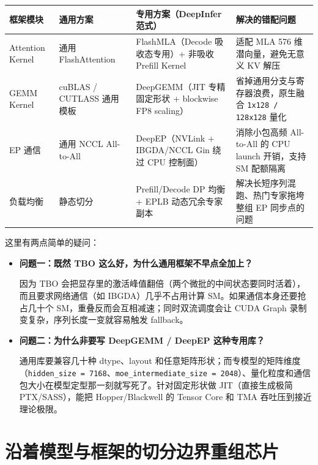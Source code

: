 \documentclass[11pt]{article}
\begin{document}
\begin{table}[htbp]
  \centering
  \small
  \begin{tabular}{p{2.0cm}p{3.0cm}p{5.0cm}p{4.8cm}}
    \hline
    \textbf{框架模块} & \textbf{通用方案} & \textbf{专用方案（DeepInfer 范式）} & \textbf{解决的错配问题} \\
    \hline
    Attention Kernel & 通用 FlashAttention & FlashMLA（Decode 吸收态专用）+ 非吸收 Prefill Kernel & 适配 MLA 576 维潜向量，避免无意义 KV 解压 \\
    \hline
    GEMM Kernel & cuBLAS / CUTLASS 通用模板 & DeepGEMM（JIT 专精固定形状 + blockwise FP8 scaling） & 省掉通用分支与寄存器浪费，原生融合 \texttt{1x128 / 128x128} 量化 \\
    \hline
    EP 通信 & 通用 NCCL All-to-All & DeepEP（NVLink + IBGDA/NCCL Gin 绕过 CPU 控制面） & 消除小包高频 All-to-All 的 CPU launch 开销，支持 SM 配额隔离 \\
    \hline
    负载均衡 & 静态切分 & Prefill/Decode DP 均衡 + EPLB 动态冗余专家副本 & 解决长短序列混跑、热门专家拖垮整组 EP 同步点的问题 \\
    \hline
  \end{tabular}
\end{table}

这里有两点简单的疑问：

\begin{itemize}
  \item \textbf{问题一：既然 TBO 这么好，为什么通用框架不早点全加上？}

  因为 TBO 会把显存里的激活峰值翻倍（两个微批的中间状态要同时活着），而且要求网络通信（如 IBGDA）几乎不占用计算 SM。如果通信本身还要抢占几十个 SM，重叠反而会互相减速；同时双流调度会让 CUDA Graph 录制变复杂，序列长度一变就容易触发 fallback。

  \item \textbf{问题二：为什么非要写 DeepGEMM / DeepEP 这种专用库？}

  通用库要兼容几十种 dtype、layout 和任意矩阵形状；而专模型的矩阵维度（\texttt{hidden\_size = 7168}、\texttt{moe\_intermediate\_size = 2048}）、量化粒度和通信包大小在模型定型那一刻就写死了。针对固定形状做 JIT（直接生成极简 PTX/SASS），能把 Hopper/Blackwell 的 Tensor Core 和 TMA 吞吐压到接近理论极限。
\end{itemize}

\section{沿着模型与框架的切分边界重组芯片}
\end{document}
